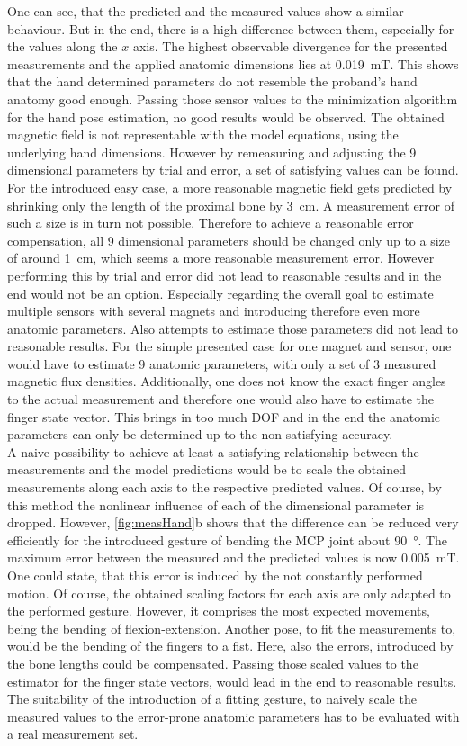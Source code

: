 One can see, that the predicted and the measured values show a similar behaviour. But in the end, there is a high difference between them, especially for the values along the $ x $ axis. The highest observable divergence for the presented measurements and the applied anatomic dimensions lies at \SI{0.019}{\milli \tesla}. This shows that the hand determined parameters do not resemble the proband's hand anatomy good enough. Passing those sensor values to the minimization algorithm for the hand pose estimation, no good results would be observed. The obtained magnetic field is not representable with the model equations, using the underlying hand dimensions. However by remeasuring and adjusting the 9 dimensional parameters by trial and error, a set of satisfying values can be found. For the introduced easy case, a more reasonable magnetic field gets predicted by shrinking only the length of the proximal bone by \SI{3}{\cm}. A measurement error of such a size is in turn not possible. Therefore to achieve a reasonable error compensation, all 9 dimensional parameters should be changed only up to a size of around \SI{1}{\cm}, which seems a more reasonable measurement error. However performing this by trial and error did not lead to reasonable results and in the end would not be an option. Especially regarding the overall goal to estimate multiple sensors with several magnets and introducing therefore even more anatomic parameters. Also attempts to estimate those parameters did not lead to reasonable results. For the simple presented case for one magnet and sensor, one would have to estimate 9 anatomic parameters, with only a set of 3 measured magnetic flux densities. Additionally, one does not know the exact finger angles to the actual measurement and therefore one would also have to estimate the finger state vector. This brings in too much \ac{DOF} and in the end the anatomic parameters can only be determined up to the non-satisfying accuracy.\\ 
A naive possibility to achieve at least a satisfying relationship between the measurements and the model predictions would be to scale the obtained measurements along each axis to the respective predicted values. Of course, by this method the nonlinear influence of each of the dimensional parameter is dropped. However, \ref{fig:measHand}b shows that the difference can be reduced very efficiently for the introduced gesture of bending the \ac{MCP} joint about \SI{90}{\degree}. The maximum error between the measured and the predicted values is now \SI{0.005}{\milli \tesla}. One could state, that this error is induced by the not constantly performed motion. Of course, the obtained scaling factors for each axis are only adapted to the performed gesture. However, it comprises the most expected movements, being the bending of flexion-extension. Another pose, to fit the measurements to, would be the bending of the fingers to a fist. Here, also the errors, introduced by the bone lengths could be compensated. Passing those scaled values to the estimator for the finger state vectors, would lead in the end to reasonable results. The suitability of the introduction of a fitting gesture, to naively scale the measured values to the error-prone anatomic parameters has to be evaluated with a real measurement set.
